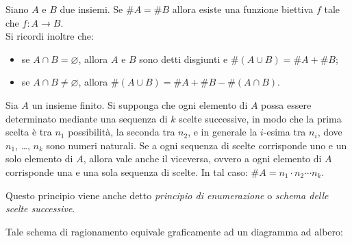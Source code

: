 Siano $A$ e $B$ due insiemi. Se $\#A=\#B$ allora esiste una funzione biettiva $f$ tale che $f : A\rightarrow B$. \\
Si ricordi inoltre che:
\begin{itemize}
	\item se $A \cap B = \varnothing$, allora $A$ e $B$ sono detti disgiunti e $\#(A\cup B)= \#A +\#B$;
	\item se $A \cap B \ne \varnothing$, allora $\#(A\cup B)= \#A +\#B - \#(A\cap B)$.
\end{itemize}

\medskip
\begin{defn}
	Sia $A$ un insieme finito.
	Si supponga che ogni elemento di $A$ possa essere determinato mediante una sequenza di $k$ scelte successive, in modo che la prima scelta è tra $n_1$ possibilità, la seconda tra $n_2$, e in generale la $i$-esima tra $n_i$, dove $n_1$, \dots, $n_k$ sono numeri naturali.
	Se a ogni sequenza di scelte corrisponde uno e un solo elemento di $A$, allora vale anche il viceversa, ovvero a ogni elemento di $A$ corrisponde una e una sola sequenza di scelte.
	In tal caso: $\#A = n_1\cdot n_2 \cdots n_k$.
\end{defn}

Questo principio viene anche detto \emph{principio di enumerazione} o \emph{schema delle scelte successive}.

Tale schema di ragionamento equivale graficamente ad un diagramma ad albero:

